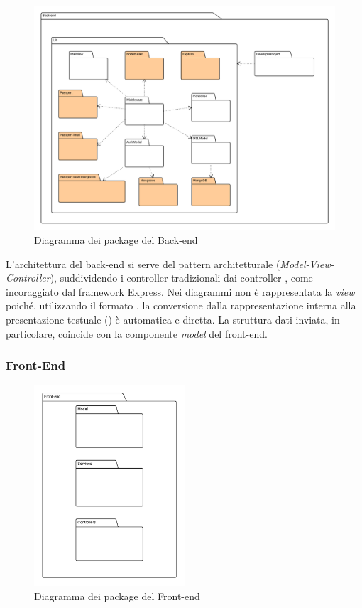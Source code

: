 \begin{figure}[H]
\centering
\includegraphics[width=\textwidth]{uml/Back-end-Diagramma dei Packages.png}
\caption{Diagramma dei package del Back-end}
\end{figure}

L'architettura del back-end si serve del pattern architetturale  (\textit{Model-View-Controller}), suddividendo i controller tradizionali dai controller , come incoraggiato dal framework Express. Nei diagrammi non è rappresentata la \textit{view} poiché, utilizzando il formato , la conversione dalla rappresentazione interna alla presentazione testuale () è automatica e diretta. La struttura dati inviata, in particolare, coincide con la componente \textit{model} del front-end.

\subsubsection{Front-End}

\begin{figure}[H]
\centering
\includegraphics[width=0.5\textwidth]{uml/Front-end-Diagramma dei packages.png}
\caption{Diagramma dei package del Front-end}
\end{figure}

